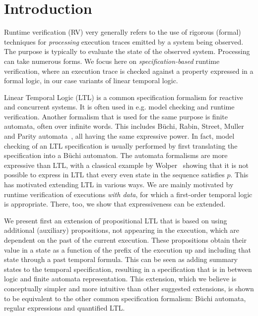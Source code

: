 
\section{Introduction}

Runtime verification (RV)  \cite{bartocci18,havelund-rv-data-2018} very generally refers to the use of rigorous (formal) 
techniques for {\em processing} execution traces emitted by a system being observed. The purpose is typically
to evaluate the state of the observed system. Processing can take numerous
forms. We focus here on {\em specification-based} runtime verification, where an execution trace is checked against a property expressed in a formal logic, in our case variants of linear temporal logic.

Linear Temporal Logic (LTL) is a common specification formalism for reactive and concurrent systems. It is often used in e.g. model checking and runtime verification. Another formalism that is used for the same purpose is finite automata, often over infinite words. This includes B\"{u}chi, Rabin, Street, Muller and Parity automata~\cite{Thomas}, all having the same expressive power. In fact, model checking of an LTL specification
is usually performed by first translating the specification into a B\"{u}chi automaton. The automata formalisms are more expressive than LTL, with a classical example by Wolper~\cite{Wolper} showing that
it is not possible to express in LTL that every even state in
the sequence satisfies $p$. This has motivated extending LTL
in various ways.
We are mainly motivated by runtime verification of executions {\em with data}, for which a first-order temporal logic is
appropriate. There, too, we show that expressiveness can be extended.

We present first an extension of  propositional LTL that is based on using additional (auxiliary) propositions, not appearing in the execution, which are dependent on the past 
of the current execution. These propositions obtain their value in a state as a function of the prefix of the execution up and including that state through a past temporal formula. This can be seen as adding
summary states to the temporal specification, resulting in a specification that is in between logic and finite automata representation. This extension, which we believe is conceptually simpler
and more intuitive than other suggested extensions, is shown to be
equivalent to the other common specification formalism:
B\"{u}chi automata, regular expressions and quantified LTL.

